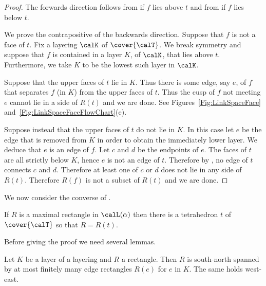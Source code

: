 \documentclass[12pt]{amsart}
\begin{document}
\begin{proof}
The forwards direction follows from  if $f$ lies above $t$ and from  if $f$ lies below $t$. 

We prove the contrapositive of the backwards direction.  Suppose that $f$ is not a face of $t$.  Fix a layering $\calK$ of $\cover{\calT}$.  We break symmetry and suppose that $f$ is contained in a layer $K$, of $\calK$, that lies above $t$.  Furthermore, we take $K$ to be the lowest such layer in $\calK$.  

Suppose that the upper faces of $t$ lie in $K$.  Thus there is some edge, say $e$, of $f$ that separates $f$ (in $K$) from the upper faces of $t$.  Thus the cusp of $f$ not meeting $e$ cannot lie in a side of $R(t)$ and we are done.  See Figures~\ref{Fig:LinkSpaceFace} and~\ref{Fig:LinkSpaceFaceFlowChart}(e).

Suppose instead that the upper faces of $t$ do not lie in $K$.  In this case let $e$ be the edge that is removed from $K$ in order to obtain the immediately lower layer.  We deduce that $e$ is an edge of $f$.  Let $c$ and $d$ be the endpoints of $e$.  The faces of $t$ are all strictly below $K$, hence $e$ is not an edge of $t$.  Therefore by , no edge of $t$ connects $c$ and $d$.  Therefore at least one of $c$ or $d$ does not lie in any side of $R(t)$.  Therefore $R(f)$ is not a subset of $R(t)$ and we are done.
\end{proof}

We now consider the converse of .

\begin{theorem}
\label{Thm:MaximalRectangle}
If $R$ is a maximal rectangle in $\calL(\alpha)$ then there is a tetrahedron $t$ of $\cover{\calT}$ so that $R = R(t)$.
\end{theorem}

Before giving the proof we need several lemmas.

\begin{lemma}
\label{Lem:FinitelySpanned}
Let $K$ be a layer of a layering and $R$ a rectangle. Then $R$ is south-north spanned by at most finitely many edge rectangles $R(e)$ for $e$ in $K$.  The same holds west-east.
\end{lemma}
\end{document}
